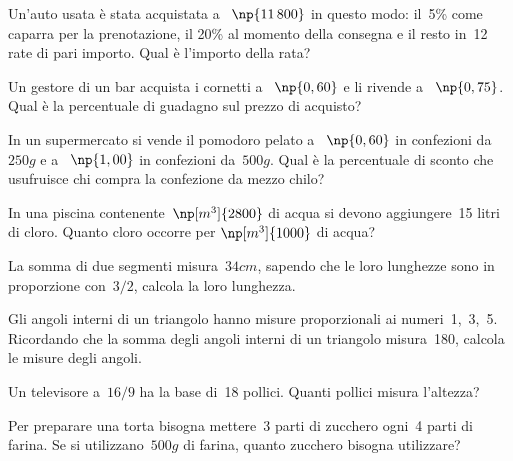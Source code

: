 \begin{multicols}{2}
\begin{esercizio}[\Ast]
Un'auto usata è stata acquistata a \officialeuro~$\np{11\,800}$
in questo modo: il~5\% come caparra per la prenotazione, il
20\% al momento della consegna e il resto in~12 rate di pari importo.
Qual è l'importo della rata?
\end{esercizio}

\begin{esercizio}[\Ast]
Un gestore di un bar acquista i cornetti a \officialeuro~$\np{0,60}$ e li rivende a
\officialeuro~$\np{0,75}$. Qual è la percentuale di guadagno sul prezzo di
acquisto?
\end{esercizio}

\begin{esercizio}
In un supermercato si vende il pomodoro pelato a \officialeuro~$\np{0,60}$ in
confezioni da~$250\unit{g}$ e a \officialeuro~$\np{1,00}$ in confezioni da~$500\unit{g}$. Qual è la
percentuale di sconto che usufruisce chi compra la confezione da mezzo
chilo?
\end{esercizio}

\begin{esercizio}[\Ast]
In una piscina contenente~$\np[m^3]{2800}$ di acqua si devono
aggiungere~15 litri di cloro. Quanto cloro occorre per
$\np[m^3]{1000}$ di acqua?
\end{esercizio}

\begin{esercizio}[\Ast]
La somma di due segmenti misura~$34\unit{cm}$, sapendo che le loro lunghezze
sono in proporzione con~$3/2$, calcola la loro lunghezza.
\end{esercizio}

\begin{esercizio}[\Ast]
Gli angoli interni di un triangolo hanno misure proporzionali ai
numeri~1,~3,~5. Ricordando che la somma degli angoli interni di un
triangolo misura~180\textdegree{}, calcola le misure degli angoli.
\end{esercizio}

\begin{esercizio}
Un televisore a~$16/9$ ha la base di~18 pollici. Quanti
pollici misura l'altezza?
\end{esercizio}

\begin{esercizio}
Per preparare una torta bisogna mettere~3 parti di zucchero ogni~4
parti di farina. Se si utilizzano~$500\unit{g}$ di farina, quanto zucchero
bisogna utilizzare?
\end{esercizio}


\end{multicols}
